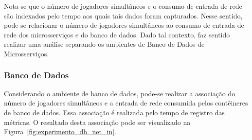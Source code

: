 Nota-se que o número de jogadores simultâneos e o consumo de entrada de rede são indexados pelo tempo aos quais tais dados foram capturados.
%
Nesse sentido, pode-se relacionar o número de jogadores simultâneos ao consumo de entrada de rede dos microsserviços e do banco de dados.
%
Dado tal contexto, faz sentido realizar uma análise separando os ambientes de Banco de Dados de Microsserviços.

\subsubsection{Banco de Dados}

Considerando o ambiente de banco de dados, pode-se realizar a associação do número de jogadores simultâneos e a entrada de rede consumida pelos contêineres de banco de dados.
%
Essa associação é realizada pelo tempo de registro das métricas.
%
O resultado desta associação pode ser visualizado na Figura~\ref{fig:experimento_db_net_in}.

